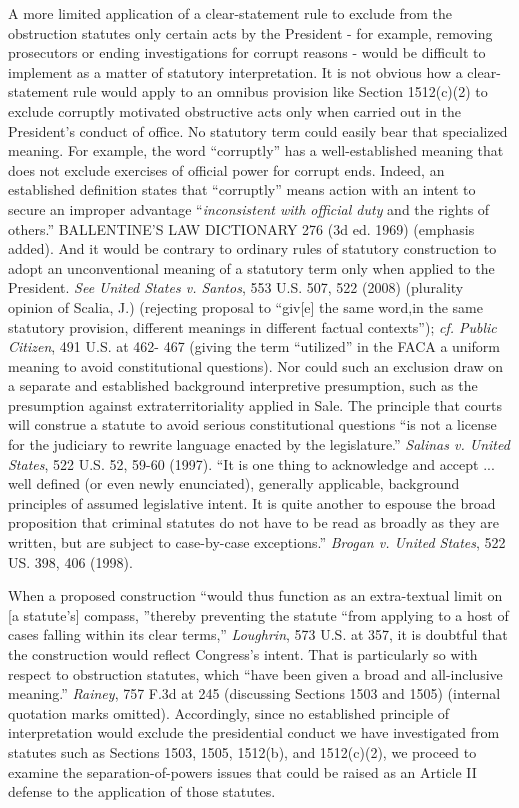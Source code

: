 A more limited application of a clear-statement rule to exclude from the obstruction statutes only certain acts by the President - for example, removing prosecutors or ending investigations for corrupt reasons - would be difficult to implement as a matter of statutory interpretation.
It is not obvious how a clear-statement rule would apply to an omnibus provision like Section 1512(c)(2) to exclude corruptly motivated obstructive acts only when carried out in the President’s conduct of office.
No statutory term could easily bear that specialized meaning.
For example, the word “corruptly” has a well-established meaning that does not exclude exercises of official power for corrupt ends.
Indeed, an established definition states that “corruptly” means action with an intent to secure an improper advantage “\textit{inconsistent with official duty} and the rights of others.”
BALLENTINE’S LAW DICTIONARY 276 (3d ed. 1969) (emphasis added).
And it would be contrary to ordinary rules of statutory construction to adopt an unconventional meaning of a statutory term only when applied to the President.
\textit{See United States v. Santos}, 553 U.S. 507, 522 (2008) (plurality opinion of Scalia, J.) (rejecting proposal to “giv[e] the same word,in the same statutory provision, different meanings in different factual contexts”);
\textit{cf. Public Citizen}, 491 U.S. at 462- 467 (giving the term “utilized” in the FACA a uniform meaning to avoid constitutional questions).
Nor could such an exclusion draw on a separate and established background interpretive presumption, such as the presumption against extraterritoriality applied in Sale.
The principle that courts will construe a statute to avoid serious constitutional questions “is not a license for the judiciary to rewrite language enacted by the legislature.”
\textit{Salinas v. United States}, 522 U.S. 52, 59-60 (1997).
“It is one thing to acknowledge and accept ... well defined (or even newly enunciated), generally applicable, background principles of assumed legislative intent.
It is quite another to espouse the broad proposition that criminal statutes do not have to be read as broadly as they are written, but are subject to case-by-case exceptions.”
\textit{Brogan v. United States}, 522 US. 398, 406 (1998).

When a proposed construction “would thus function as an extra-textual limit on [a statute’s] compass, ”thereby preventing the statute “from applying to a host of cases falling within its clear terms,” \textit{Loughrin}, 573 U.S. at 357, it is doubtful that the construction would reflect Congress’s intent.
That is particularly so with respect to obstruction statutes, which “have been given a broad and all-inclusive meaning.”
\textit{Rainey}, 757 F.3d at 245 (discussing Sections 1503 and 1505) (internal quotation marks omitted).
Accordingly, since no established principle of interpretation would exclude the presidential conduct we have investigated from statutes such as Sections 1503, 1505, 1512(b), and 1512(c)(2), we proceed to examine the separation-of-powers issues that could be raised as an Article II defense to the application of those statutes.

